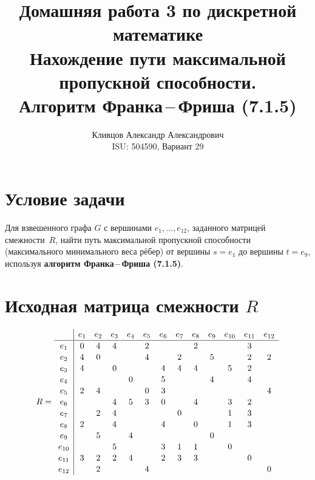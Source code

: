 \documentclass[a4paper,12pt]{article}
\title{\textbf{Домашняя работа 3 по дискретной математике}\\[0.5em]
\large Нахождение пути максимальной пропускной способности.\\
Алгоритм Франка\,--\,Фриша (7.1.5)}
\author{Кливцов Александр Александрович \\ ISU: 504590, Вариант 29}
\date{}
\begin{document}
\maketitle
\thispagestyle{empty}

\section*{Условие задачи}

Для взвешенного графа $G$ с вершинами $e_1, \ldots, e_{12}$, заданного матрицей
смежности~$R$, найти путь максимальной пропускной способности (максимального
минимального веса рёбер) от вершины $s = e_1$ до вершины $t = e_9$, используя
\textbf{алгоритм Франка\,--\,Фриша (7.1.5)}.

\section*{Исходная матрица смежности $R$}

\[
	R =
	\renewcommand{\arraystretch}{1.1}
	\begin{array}{c|cccccccccccc}
		       & e_1 & e_2 & e_3 & e_4 & e_5 & e_6 & e_7 & e_8 & e_9 & e_{10} & e_{11} & e_{12} \\\hline
		e_1    & 0   & 4   & 4   &     & 2   &     &     & 2   &     &        & 3      &        \\
		e_2    & 4   & 0   &     &     & 4   &     & 2   &     & 5   &        & 2      & 2      \\
		e_3    & 4   &     & 0   &     &     & 4   & 4   & 4   &     & 5      & 2      &        \\
		e_4    &     &     &     & 0   &     & 5   &     &     & 4   &        & 4      &        \\
		e_5    & 2   & 4   &     &     & 0   & 3   &     &     &     &        &        & 4      \\
		e_6    &     &     & 4   & 5   & 3   & 0   &     & 4   &     & 3      & 2      &        \\
		e_7    &     & 2   & 4   &     &     &     & 0   &     &     & 1      & 3      &        \\
		e_8    & 2   &     & 4   &     &     & 4   &     & 0   &     & 1      & 3      &        \\
		e_9    &     & 5   &     & 4   &     &     &     &     & 0   &        &        &        \\
		e_{10} &     &     & 5   &     &     & 3   & 1   & 1   &     & 0      &        &        \\
		e_{11} & 3   & 2   & 2   & 4   &     & 2   & 3   & 3   &     &        & 0      &        \\
		e_{12} &     & 2   &     &     & 4   &     &     &     &     &        &        & 0      \\
	\end{array}
\]
\end{document}

